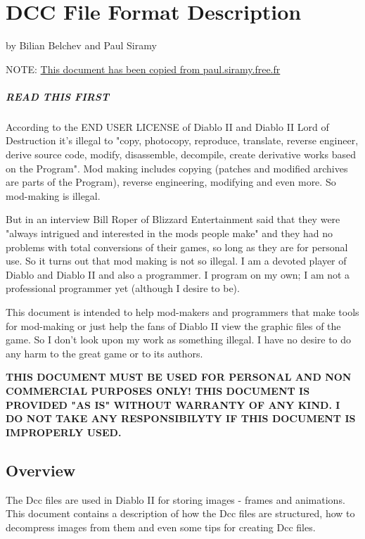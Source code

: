 \chapter{DCC File Format Description} \label{app:dccspec}

\begin{centering}
\large{by Bilian Belchev and Paul Siramy}\\
\end{centering}

\vspace{1cm}
NOTE: \href{http://paul.siramy.free.fr/_divers/dcc_doc.zip}{This document has been copied from paul.siramy.free.fr}


\paragraph{READ THIS FIRST}
According to the END USER LICENSE of Diablo II and Diablo II Lord of Destruction 
it's illegal to "copy, photocopy, reproduce, translate, reverse engineer, derive 
source code, modify, disassemble, decompile, create derivative works based on 
the Program". Mod making includes copying (patches and modified archives are 
parts of the Program), reverse engineering, modifying and even more. So 
mod-making is illegal.

But in an interview Bill Roper of Blizzard Entertainment 
said that they were "always intrigued and interested in the mods people make" 
and they had no problems with total conversions of their games, so long as they 
are for personal use. So it turns out that mod making is not so illegal. I am a 
devoted player of Diablo and Diablo II and also a programmer. I program on my 
own; I am not a professional programmer yet (although I desire to be). 

This document is intended to help mod-makers and programmers that make tools for 
mod-making or just help the fans of Diablo II view the graphic files of the 
game. So I don't look upon my work as something illegal. I have no desire to do 
any harm to the great game or to its authors. 

\textbf{
THIS DOCUMENT MUST BE USED FOR PERSONAL AND NON COMMERCIAL PURPOSES ONLY! THIS 
DOCUMENT IS PROVIDED "AS IS" WITHOUT WARRANTY OF ANY KIND. I DO NOT TAKE ANY 
RESPONSIBILYTY IF THIS DOCUMENT IS IMPROPERLY USED.
}


\newpage
\section{Overview}
The Dcc files are used in Diablo II for storing images - frames and animations.
This document contains a description of how the Dcc files are structured, how 
to decompress images from them and even some tips for creating Dcc files.

